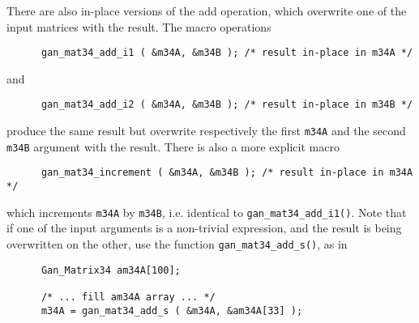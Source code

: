 There are also in-place versions of the add operation, which overwrite one
of the input matrices with the result. The macro operations
\begin{verbatim}
      gan_mat34_add_i1 ( &m34A, &m34B ); /* result in-place in m34A */
\end{verbatim}
and
\begin{verbatim}
      gan_mat34_add_i2 ( &m34A, &m34B ); /* result in-place in m34B */
\end{verbatim}
produce the same result but overwrite respectively the first {\tt m34A}
and the second {\tt m34B} argument with the result. There is also a
more explicit macro
\begin{verbatim}
      gan_mat34_increment ( &m34A, &m34B ); /* result in-place in m34A */
\end{verbatim}
which increments {\tt m34A} by {\tt m34B}, i.e. identical to
{\tt gan\_mat34\_add\_i1()}. Note that if one of the input arguments is
a non-trivial expression, and the result is being overwritten on the other,
use the function {\tt gan\_mat34\_add\_s()}, as in
\begin{verbatim}
      Gan_Matrix34 am34A[100];

      /* ... fill am34A array ... */
      m34A = gan_mat34_add_s ( &m34A, &am34A[33] );
\end{verbatim}

